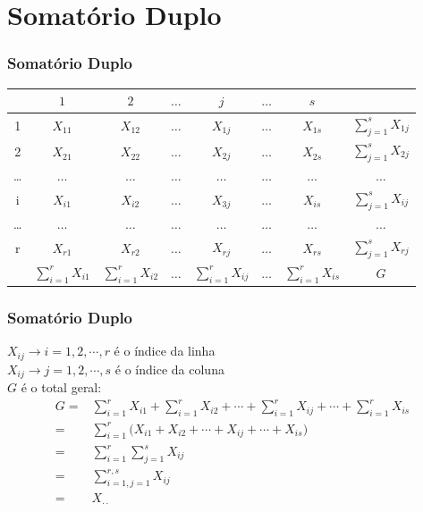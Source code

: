 \documentclass[12pt]{beamer}
\begin{document}
\section{Somatório Duplo}
\begin{frame}{}
\frametitle{Somatório Duplo}
\vspace{-0.5cm}
\begin{block}{}
\begin{table}[H]
    \centering
    \begin{tabular}{c|ccccccc}
          & $1$       &$2$        &$\ldots$& $j$       &$\ldots$& $s$       &\\
    \hline
        1 & $X_{11}$  & $X_{12}$  &$\ldots$& $X_{1j}$  &$\ldots$& $X_{1s}$  &${\displaystyle \sum_{j=1}^{s}X_{1j}}$  \\
        2 & $X_{21}$  & $X_{22}$  &$\ldots$& $X_{2j}$  &$\ldots$& $X_{2s}$  &${\displaystyle \sum_{j=1}^{s}X_{2j}}$  \\
    \ldots& $\ldots$  & $\ldots$  &$\ldots$& $\ldots$  &$\ldots$& $\ldots$  &$ \ldots$\\
        i & $X_{i1}$  & $X_{i2}$  &$\ldots$& $X_{3j}$  &$\ldots$& $X_{is}$  &${\displaystyle \sum_{j=1}^{s}X_{ij}}$  \\
    \ldots& $\ldots$  & $\ldots$  &$\ldots$& $\ldots$  &$\ldots$& $\ldots$  &$ \ldots$\\
        r & $X_{r1}$  & $X_{r2}$  &$\ldots$& $X_{rj}$  &$\ldots$& $X_{rs}$  &${\displaystyle \sum_{j=1}^{s}X_{rj}}$  \\
        \hline
          &${\displaystyle \sum_{i=1}^{r}X_{i1}}$ &${\displaystyle \sum_{i=1}^{r}X_{i2}}$&$\ldots$ &${\displaystyle \sum_{i=1}^{r}X_{ij}}$&$\ldots$ &${\displaystyle \sum_{i=1}^{r}X_{is}}$&$G$
    \end{tabular}
    \label{tab:my_label}
\end{table}
\end{block}
\end{frame}

\begin{frame}{}
\frametitle{Somatório Duplo}
\vspace{-0.3cm}
\begin{block}{}
$X_{ij}\rightarrow i=1,2,\cdots,r$ é o índice da linha\\
$X_{ij}\rightarrow j=1,2,\cdots,s$ é o índice da coluna\\
$G$ é o total geral:
\begin{align*}
G=&{\displaystyle \sum_{i=1}^{r}X_{i1}
                +\sum_{i=1}^{r}X_{i2}
                +\cdots
                +\sum_{i=1}^{r}X_{ij}
                +\cdots
                +\sum_{i=1}^{r}X_{is}}\\
=&{\displaystyle \sum_{i=1}^{r}(X_{i1}
                + X_{i2}
                +\cdots
                + X_{ij}
                +\cdots
                + X_{is}})\\
=&{\displaystyle \sum_{i=1}^{r}\sum_{j=1}^{s}X_{ij}}\\
=&{\displaystyle \sum_{i=1,j=1}^{r,s}X_{ij}}\\
=&X_{\cdot \cdot}
\end{align*}
\end{block}
\end{frame}
\end{document}
